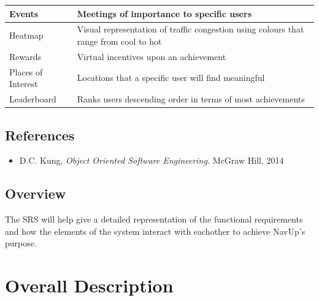 \documentclass{article}
\begin{document}
\begin{table}[h!]
\begin{tabular}{|l|l|}
Events             & Meetings of importance to specific users                                              \\ \hline
Heatmap            & Visual representation of traffic congestion using colours that range from cool to hot \\ \hline
Rewards            & Virtual incentives upon an achievement                                                \\ \hline
Places of Interest & Locations that a specific user will find meaningful                                   \\ \hline
Leaderboard        & Ranks users descending order in terms of most achievements                            \\ \hline
\end{tabular}
\end{table}

	
	\subsection{References}
	\begin{itemize}
		\item D.C. Kung, \textit{Object Oriented Software Engineering.} McGraw Hill, 2014
	\end{itemize}
	\subsection{Overview}
	The SRS will help give a detailed representation of the functional requirements and how the elements of the system interact with eachother to achieve NavUp's purpose. 
	
	\section{Overall Description}
\end{document}

